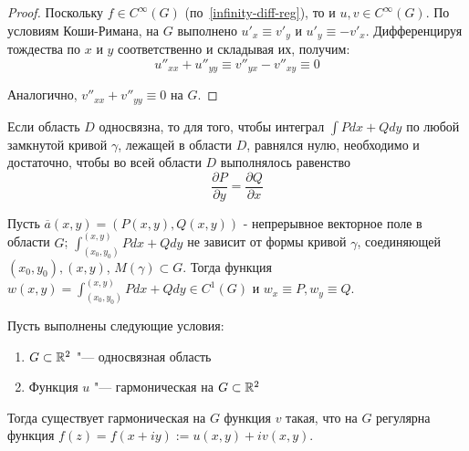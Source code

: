 \begin{proof}
	Поскольку $f \in C^\infty(G)$ (по~\ref{infinity-diff-reg}), то и $u, v \in C^\infty(G)$. По условиям Коши-Римана, на $G$ выполнено $u'_x \equiv v'_y$ и $u'_y \equiv -v'_x$. Дифференцируя тождества по $x$ и $y$ соответственно и складывая их, получим:
	\[u''_{xx} + u''_{yy} \equiv v''_{yx} - v''_{xy} \equiv 0\]
	
	Аналогично, $v''_{xx} + v''_{yy} \equiv 0$ на $G$.
\end{proof}

\begin{unnecessary}
    \begin{theorem}[из матана]
    \label{from_matan}
        Если область $D$ односвязна, то для того, чтобы интеграл $\int P dx + Q dy$ по любой замкнутой кривой $\gamma$, лежащей в области $D$, равнялся нулю, необходимо и достаточно, чтобы во всей области $D$ выполнялось равенство 
        \[ \frac{\partial{P}}{\partial{y}}=\frac{\partial{Q}}{\partial{x}} \]
        
    \end{theorem}
    
    \begin{theorem}[из матана] \label{from_matan1}
        Пусть $\overline{a}(x,y)=(P(x, y), Q(x, y))$ - непрерывное векторное поле в области $G$; $\int_{(x_0, y_0)}^{(x,y)} Pdx+Qdy$ не зависит от формы кривой $\gamma$, соединяющей $(x_0, y_0), (x,y)$, $M(\gamma) \subset G$. Тогда функция $w(x,y)=\int_{(x_0, y_0)}^{(x,y)} P dx + Q dy \in C^1 (G)$ и $w_x \equiv P, w_y \equiv Q$.
    \end{theorem}
\end{unnecessary}

\begin{proposition}
	Пусть выполнены следующие условия:
	\begin{enumerate}
		\item $G \subset \mathbb{R}^2$ "--- односвязная область
		\item Функция $u$ "--- гармоническая на $G \subset \mathbb{R}^2$
	\end{enumerate}
	
	Тогда существует гармоническая на $G$ функция $v$ такая, что на $G$ регулярна функция $f(z) = f(x + iy) := u(x, y) + iv(x, y)$.
\end{proposition}

